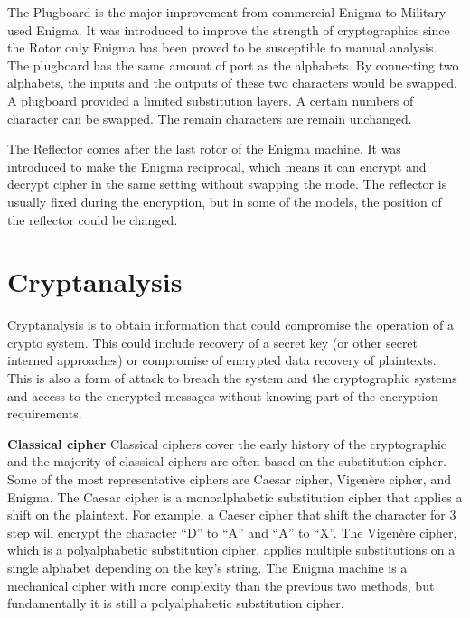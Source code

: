 
The Plugboard is the major improvement from commercial Enigma to Military used Enigma. It was introduced to improve the strength of cryptographics since the Rotor only Enigma has been proved to be susceptible to manual analysis. The plugboard has the same amount of port as the alphabets. By connecting two alphabets, the inputs and the outputs of these two characters would be swapped. A plugboard provided a limited substitution layers. A certain numbers of character can be swapped. The remain characters are remain unchanged. 

The Reflector comes after the last rotor of the Enigma machine. It was introduced to make the Enigma reciprocal, which means it can encrypt and decrypt cipher in the same setting without swapping the mode. The reflector is usually fixed during the encryption, but in some of the models, the position of the reflector could be changed. 


\section{Cryptanalysis}

Cryptanalysis is to obtain information that could compromise the operation of a crypto system. This could include recovery of a secret key (or other secret interned approaches) or compromise of encrypted data recovery of plaintexts. This is also a form of attack to breach the system and the cryptographic systems and access to the encrypted messages without knowing part of the encryption requirements.  

\noindent\textbf{Classical cipher} \qquad		Classical ciphers cover the early history of the cryptographic and the majority of classical ciphers are often based on the substitution cipher. Some of the most representative ciphers are Caesar cipher, Vigenère cipher, and Enigma. The Caesar cipher is a monoalphabetic substitution cipher that applies a shift on the plaintext. For example, a Caeser cipher that shift the character for 3 step will encrypt the character “D” to “A” and “A” to “X”. The Vigenère cipher, which is a polyalphabetic substitution cipher, applies multiple substitutions on a single alphabet depending on the key's string. The Enigma machine is a mechanical cipher with more complexity than the previous two methods, but fundamentally it is still a polyalphabetic substitution cipher.

